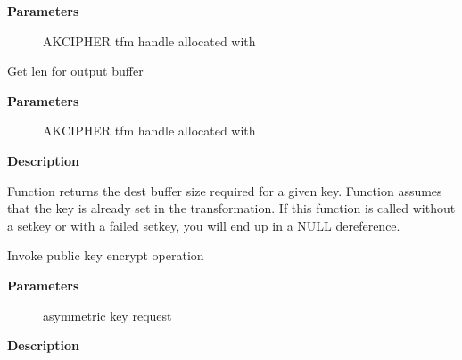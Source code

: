 \documentclass[a4paper,8pt,english]{sphinxmanual}
\begin{document}
\textbf{Parameters}
\begin{description}
\item[{}] \leavevmode
AKCIPHER tfm handle allocated with {\hyperref[crypto/api\string-akcipher:c.crypto_alloc_akcipher]{\emph{}}}

\end{description}

\begin{fulllineitems}
\label{crypto/api-akcipher:c.crypto_akcipher_maxsize}
Get len for output buffer

\end{fulllineitems}


\textbf{Parameters}
\begin{description}
\item[{}] \leavevmode
AKCIPHER tfm handle allocated with {\hyperref[crypto/api\string-akcipher:c.crypto_alloc_akcipher]{\emph{}}}

\end{description}

\textbf{Description}

Function returns the dest buffer size required for a given key.
Function assumes that the key is already set in the transformation. If this
function is called without a setkey or with a failed setkey, you will end up
in a NULL dereference.

\begin{fulllineitems}
\label{crypto/api-akcipher:c.crypto_akcipher_encrypt}
Invoke public key encrypt operation

\end{fulllineitems}


\textbf{Parameters}
\begin{description}
\item[{}] \leavevmode
asymmetric key request

\end{description}

\textbf{Description}
\end{document}
